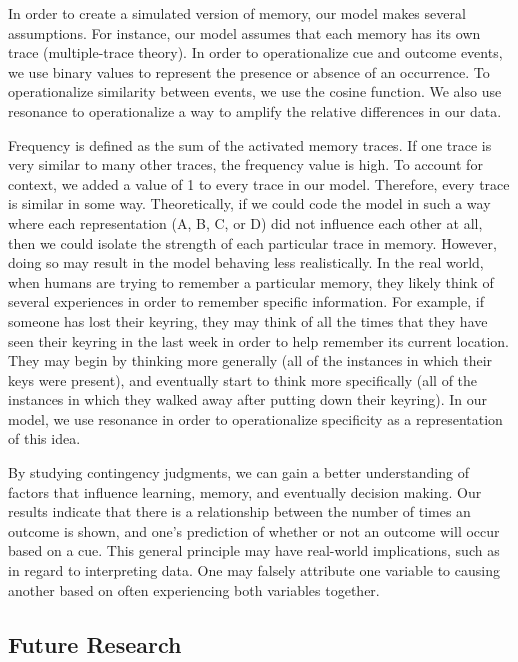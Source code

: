 \documentclass[
  english,
  man,floatsintext]{apa6}
\begin{document}
In order to create a simulated version of memory, our model makes several assumptions. For instance, our model assumes that each memory has its own trace (multiple-trace theory). In order to operationalize cue and outcome events, we use binary values to represent the presence or absence of an occurrence. To operationalize similarity between events, we use the cosine function. We also use resonance to operationalize a way to amplify the relative differences in our data.

Frequency is defined as the sum of the activated memory traces. If one trace is very similar to many other traces, the frequency value is high. To account for context, we added a value of 1 to every trace in our model. Therefore, every trace is similar in some way. Theoretically, if we could code the model in such a way where each representation (A, B, C, or D) did not influence each other at all, then we could isolate the strength of each particular trace in memory. However, doing so may result in the model behaving less realistically. In the real world, when humans are trying to remember a particular memory, they likely think of several experiences in order to remember specific information. For example, if someone has lost their keyring, they may think of all the times that they have seen their keyring in the last week in order to help remember its current location. They may begin by thinking more generally (all of the instances in which their keys were present), and eventually start to think more specifically (all of the instances in which they walked away after putting down their keyring). In our model, we use resonance in order to operationalize specificity as a representation of this idea.

By studying contingency judgments, we can gain a better understanding of factors that influence learning, memory, and eventually decision making. Our results indicate that there is a relationship between the number of times an outcome is shown, and one's prediction of whether or not an outcome will occur based on a cue. This general principle may have real-world implications, such as in regard to interpreting data. One may falsely attribute one variable to causing another based on often experiencing both variables together.

\hypertarget{future-research}{%
\subsection{Future Research}\label{future-research}}
\end{document}
